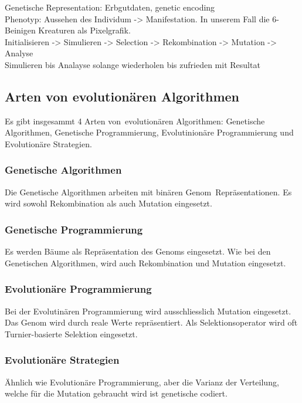 
    Genetische Representation: Erbgutdaten, genetic encoding \\
    Phenotyp: Aussehen des Individum -> Manifestation. In unserem Fall die 6-Beinigen Kreaturen als Pixelgrafik. \\
    Initialisieren -> Simulieren -> Selection -> Rekombination -> Mutation -> Analyse \\
    Simulieren bis Analayse solange wiederholen bis zufrieden mit Resultat


  \subsection{Arten von evolutionären Algorithmen}
  \label{sub:artenEvAlgos}
    Es gibt insgesammt 4 Arten von evolutionären Algorithmen:
    Genetische Algorithmen, Genetische Programmierung, Evolutinionäre Programmierung
    und Evolutionäre Strategien.

    \subsubsection{Genetische Algorithmen}
    \label{item:genAlgo}
      Die Genetische Algorithmen arbeiten mit binären Genom Repräsentationen.
      Es wird sowohl Rekombination als auch Mutation eingesetzt.

    \subsubsection{Genetische Programmierung}
    \label{item:genProg}
      Es werden Bäume als Repräsentation des Genoms eingesetzt. Wie bei den Genetischen Algorithmen,
      wird auch Rekombination und Mutation eingesetzt.

    \subsubsection{Evolutionäre Programmierung}
    \label{item:evProg}
      Bei der Evolutinären Programmierung wird ausschliesslich Mutation eingesetzt.
      Das Genom wird durch reale Werte repräsentiert. Als Selektionsoperator wird
      oft Turnier-basierte Selektion eingesetzt.

    \subsubsection{Evolutionäre Strategien}
    \label{item:evStrat}
        Ähnlich wie Evolutionäre Programmierung, aber die Varianz der Verteilung,
        welche für die Mutation gebraucht wird ist genetische codiert.
